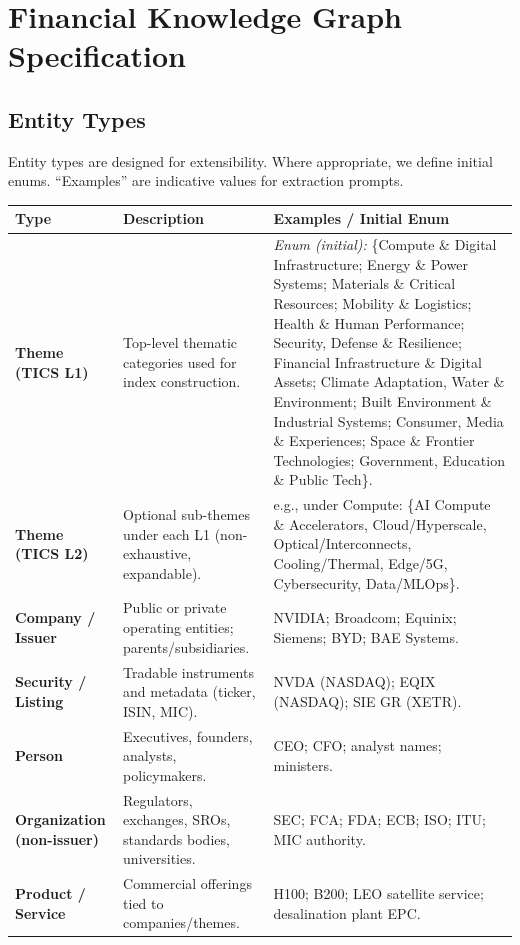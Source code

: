 \documentclass[11pt]{article}
\begin{document}
\section{Financial Knowledge Graph Specification}

\subsection{Entity Types}
Entity types are designed for extensibility. Where appropriate, we define initial enums. ``Examples'' are indicative values for extraction prompts.

\begin{longtable}{>{\bfseries}p{3.5cm} p{7.8cm} p{4.2cm}}
\toprule
Type & Description & Examples / Initial Enum \\
\midrule
Theme (TICS L1) &
Top-level thematic categories used for index construction. &
\emph{Enum (initial):} \{Compute \& Digital Infrastructure; Energy \& Power Systems; Materials \& Critical Resources; Mobility \& Logistics; Health \& Human Performance; Security, Defense \& Resilience; Financial Infrastructure \& Digital Assets; Climate Adaptation, Water \& Environment; Built Environment \& Industrial Systems; Consumer, Media \& Experiences; Space \& Frontier Technologies; Government, Education \& Public Tech\}. \\
\addlinespace
Theme (TICS L2) &
Optional sub-themes under each L1 (non-exhaustive, expandable). &
e.g., under Compute: \{AI Compute \& Accelerators, Cloud/Hyperscale, Optical/Interconnects, Cooling/Thermal, Edge/5G, Cybersecurity, Data/MLOps\}. \\
\addlinespace
Company / Issuer &
Public or private operating entities; parents/subsidiaries. &
NVIDIA; Broadcom; Equinix; Siemens; BYD; BAE Systems. \\
\addlinespace
Security / Listing &
Tradable instruments and metadata (ticker, ISIN, MIC). &
NVDA (NASDAQ); EQIX (NASDAQ); SIE GR (XETR). \\
\addlinespace
Person &
Executives, founders, analysts, policymakers. &
CEO; CFO; analyst names; ministers. \\
\addlinespace
Organization (non-issuer) &
Regulators, exchanges, SROs, standards bodies, universities. &
SEC; FCA; FDA; ECB; ISO; ITU; MIC authority. \\
\addlinespace
Product / Service &
Commercial offerings tied to companies/themes. &
H100; B200; LEO satellite service; desalination plant EPC. \\

\end{longtable}
\end{document}
